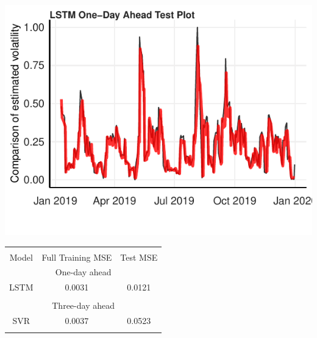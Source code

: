 \documentclass[11pt,preprint, authoryear]{elsarticle}
\let\origfigure\figure
\let\endorigfigure\endfigure
\renewenvironment{figure}[1][2] {
    \expandafter\origfigure\expandafter[H]
} {
    \endorigfigure
}
\let\origtable\table
\let\endorigtable\endtable
\renewenvironment{table}[1][2] {
    \expandafter\origtable\expandafter[H]
} {
    \endorigtable
}
\numberwithin{equation}{section}
\numberwithin{figure}{section}
\numberwithin{table}{section}
\begin{document}
\begin{figure}[H]

{\centering \includegraphics{Essay_files/figure-latex/plot_test-1} 

}

\caption{LSTM One-Day Ahead Test Forecast \label{lstm_test_one}}\label{fig:plot_test}
\end{figure}

\begin{table}[ht]
    \centering
    \caption{Forecasting full training and test performance}
    \begin{tabular}{ccc}
    \\[-1.8ex]\hline 
\hline \\[-1.8ex] 
        Model & Full Training MSE & Test MSE\\
        \hline
        \multicolumn{3}{c}{One-day ahead} \\
        \hline
        LSTM & 0.0031 & 0.0121\\
        \hline \\[-1.8ex] 
        \multicolumn{3}{c}{Three-day ahead} \\
        \hline
        SVR & 0.0037 & 0.0523\\
        \hline \\[-1.8ex] 
    \end{tabular}
    \label{tab:test_perf}
\end{table}
\end{document}
